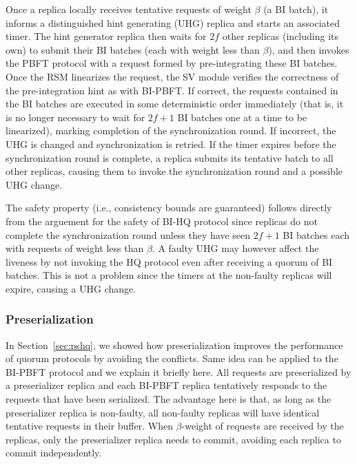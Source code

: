 \documentclass[twocolumn,10pt]{article}
\newcommand{\stitle}[1]{\vspace{2pt}{\bf #1:}}
\begin{document}
Once a replica locally receives tentative requests of weight $\beta$ (a
BI batch), it informs a distinguished hint
generating (UHG) replica and starts an associated timer. 
The hint generator replica then waits for $2f$ other replicas (including
its own) to submit their BI batches (each with weight less than $\beta$), and then
invokes the PBFT protocol with a request formed by pre-integrating these BI batches.
Once the RSM  linearizes the request, the SV module verifies the correctness of the pre-integration
hint as with BI-PBFT. If correct, the requests contained
in the BI batches are executed in some deterministic order immediately
(that is, it is no longer necessary to wait for $2f+1$ BI batches one at
a time to be linearized), marking completion of the synchronization
round. If incorrect, the UHG is changed and synchronization is
retried. If the timer expires before
the synchronization round is complete, a replica submits its tentative batch to all other replicas,
causing them to invoke the synchronization round and a possible UHG change.

\stitle{Informal correctness} The safety property (i.e., consistency bounds are guaranteed) follows
directly from the arguement for the safety of BI-HQ protocol since replicas do not complete
the synchronization round unless they have seen $2f+1$ BI batches each with requests of weight less 
than $\beta$.  A faulty UHG may however affect the liveness
by not invoking the HQ protocol even after receiving a quorum of BI batches. This is not a problem
since the timers at the non-faulty replicas will expire, causing a UHG change.

\subsubsection{Preserialization}

In Section~\ref{sec:pshq}, we showed how preserialization improves the performance of quorum
protocols by avoiding the conflicts. Same idea can be applied to the BI-PBFT protocol and we
explain it briefly here. All requests are preserialized by a preserializer replica and each BI-PBFT
replica tentatively responds to the requests that have been serialized. The advantage here is that,
as long as the preserializer replica is non-faulty, all non-faulty replicas will have identical tentative
requests in their buffer. When $\beta$-weight of requests are received by the replicas, only the 
preserializer replica needs to commit, avoiding each replica to commit independently.
\end{document}
